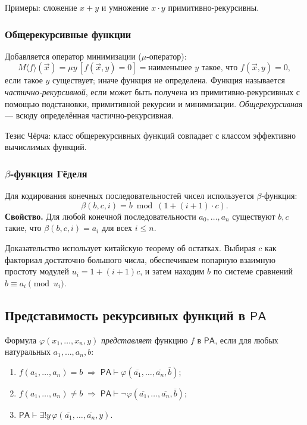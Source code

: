 \documentclass[10pt]{article}
\begin{document}
Примеры: сложение $x+y$ и умножение $x\cdot y$ примитивно-рекурсивны.

\subsubsection{Общерекурсивные функции}
Добавляется оператор минимизации ($\mu$-оператор):
\[
M\langle f\rangle(\vec{x}) = \mu y\,[f(\vec{x},y)=0] = \text{наименьшее } y\text{ такое, что } f(\vec{x},y)=0,
\]
если такое $y$ существует; иначе функция не определена. Функция называется \emph{частично-рекурсивной}, если может быть получена из примитивно-рекурсивных с помощью подстановки, примитивной рекурсии и минимизации. \emph{Общерекурсивная} — всюду определённая частично-рекурсивная.

Тезис Чёрча: класс общерекурсивных функций совпадает с классом эффективно вычислимых функций.

\subsubsection{$\beta$-функция Гёделя}
Для кодирования конечных последовательностей чисел используется $\beta$-функция:
\[
\beta(b,c,i) = b \bmod (1 + (i+1)\cdot c).
\]
\textbf{Свойство.} Для любой конечной последовательности $a_0,\dots,a_n$ существуют $b,c$ такие, что $\beta(b,c,i)=a_i$ для всех $i\le n$.

Доказательство использует китайскую теорему об остатках. Выбирая $c$ как факториал достаточно большого числа, обеспечиваем попарную взаимную простоту модулей $u_i=1+(i+1)c$, и затем находим $b$ по системе сравнений $b\equiv a_i\pmod{u_i}$.

\subsection{Представимость рекурсивных функций в $\mathsf{PA}$}
Формула $\varphi(x_1,\dots,x_n,y)$ \emph{представляет} функцию $f$ в $\mathsf{PA}$, если для любых натуральных $a_1,\dots,a_n,b$:
\begin{enumerate}
  \item $f(a_1,\dots,a_n)=b \;\Rightarrow\; \mathsf{PA}\vdash \varphi(\overline{a_1},\dots,\overline{a_n},\overline{b})$;
  \item $f(a_1,\dots,a_n)\neq b \;\Rightarrow\; \mathsf{PA}\vdash \neg\varphi(\overline{a_1},\dots,\overline{a_n},\overline{b})$;
  \item $\mathsf{PA}\vdash \exists! y\,\varphi(\overline{a_1},\dots,\overline{a_n},y)$.
\end{enumerate}
\end{document}

